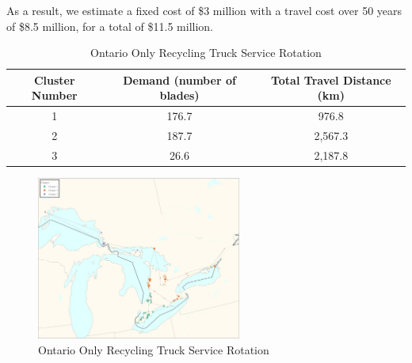 As a result, we estimate a fixed cost of \$3 million with a travel cost over 50 years of \$8.5 million, for a total of \$11.5 million.  

\begin{table}[h]
    \centering
    \begin{tabular}{c | c c } \hline
     Cluster Number & Demand (number of blades) & Total Travel Distance (km) \\ \hline\hline
     1 & 176.7 & 976.8 \\
     2 & 187.7 & 2,567.3 \\
     3 & 26.6  & 2,187.8 \\ \hline
    \end{tabular}
    \caption{Ontario Only Recycling Truck Service Rotation}
    \label{table:on_tsp}
\end{table}

\begin{figure} [h]
    \centering
    \includegraphics[width=0.6\textwidth]{graphics/fig_cluster3.jpeg}
    \caption{Ontario Only Recycling Truck Service Rotation}
    \label{fig:fig_cluster3}
\end{figure}